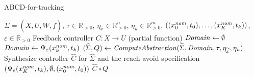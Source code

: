 
\begin{algorithm}
	\caption{ABCD-for-tracking}
	\label{alg:abcd-with-time-for-tracking}
	\begin{algorithmic}[1]
		\Require $\widetilde{\Sigma}=(\widetilde{X},U,W,\widetilde{f})$, $\tau \in \mathbb{R}_{>0}$, $\eta_x\in \mathbb{R}^n_{>0}$, $\eta_u\in \mathbb{R}^m_{>0}$, $((x_0^{\mathit{nom}},t_0),\ldots,(x_K^{\mathit{nom}},t_k))$, $\varepsilon \in \mathbb{R}_{>0}$
		 
		\Ensure Feedback controller $C:X\rightarrow U$ (partial function)
		\State $\mathit{Domain}\gets \emptyset$
		\State $\mathit{Domain}\gets \Psi_\varepsilon(x_k^{\mathit{nom}},t_k)$
		\EndFor
		\State $(\widehat{\Sigma},Q) \gets \mathit{ComputeAbstraction}(\widetilde{\Sigma}, \mathit{Domain}, \tau, \eta_{\widetilde{x}} , \eta_u)$
		\State Synthesize controller $\widehat{C}$ for $\widehat{\Sigma}$ and the reach-avoid specification $(\Psi_\varepsilon(x_K^{\mathit{nom}},t_k), \emptyset, (x_0^{\mathit{nom}},t_0))$
		\State \Return $\widehat{C}\circ Q$
	\end{algorithmic}
\end{algorithm}

